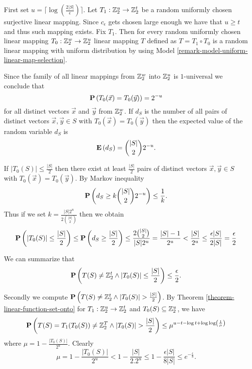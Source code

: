 First set $u = \lceil\log(\frac {2|S|}{\epsilon})\rceil$. Let $T_1: \mathbb{Z}_{2}^{u} \rightarrow \mathbb{Z}_{2}^{t}$ be a random uniformly chosen surjective linear mapping. Since $c_\epsilon$ gets chosen large enough we have that $u \geq t$ and thus such mapping exists.  Fix $T_1$. Then for every random uniformly chosen linear mapping $T_0: \mathbb{Z}_{2}^{w} \rightarrow \mathbb{Z}_{2}^{u}$ linear mapping $T$ defined as $T = T_1 \circ T_0$  is a random linear mapping with uniform distribution by using Model \ref{remark-model-uniform-linear-map-selection}. 

Since the family of all linear mappings from $\mathbb{Z}_{2}^{w}$ into $\mathbb{Z}_{2}^{u}$ is $1$-universal we conclude that \[ \mathbf{P}\left(T_0(\vec{x}) = T_0(\vec{y})\right) = 2 ^ {-u} \] for all distinct vectors $\vec {x}$ and $\vec {y}$ from $\mathbb{Z}_{2}^{w}$. If $d_S$ is the number of  all pairs of distinct vectors $\vec {x},\vec {y}\in S$ with $T_0(\vec {x}) = T_0(\vec {y})$ then the expected value of the random variable $d_S$ is \[ \mathbf{E}\left(d_S\right)= \binom{|S|}{2} 2 ^ {-u} \text{.} \]

If $|T_0(S)| \leq \frac {|S|}{2}$ then there exist at least $\frac {|S|}{2}$ pairs of distinct vectors $\vec {x},\vec {y} \in S$ with $T_0(\vec {x}) = T_0(\vec {y}
)$. By Markov inequality \[ \mathbf{P}\left(d_S \geq k\binom {|S|}{2} 2^{-u}\right) \leq \frac{1}{k} \text{.} \]
Thus if we set $k = \frac {|S|2^u}{2\binom {|S|}{2}}$ then we obtain 
\[ 
	\mathbf{P}\left(|T_0(S)| \leq \frac {|S|}{2}\right) 
		\leq \mathbf{P}\left(d_S \geq \frac {|S|}{2}\right) 
		\leq \frac{2 \binom{|S|}{2}}{|S|2^u} = \frac{|S| - 1}{2^u} < \frac{|S|}{2^u} 
		\leq \frac{\epsilon |S|}{2|S|} = \frac{\epsilon}{2}
\]

We can summarize that
\[ 
\mathbf{P}\left(T(S) \neq \mathbb{Z}_{2}^{t} \wedge |T_0(S)| \leq \frac{|S|}{2}\right) \leq \frac{\epsilon}{2} \text{.}
\]

Secondly we compute $\mathbf{P}\left(T(S) \neq \mathbb{Z}_{2}^{t} \wedge |T_0(S)| > \frac{|S|}{2}\right)$. By Theorem \ref{theorem-linear-function-set-onto} for $T_1: \mathbb{Z}_{2}^{u} \rightarrow \mathbb{Z}_{2}^{t}$ and $T_0(S) \subseteq \mathbb{Z}_{2}^{u}$, we have
\[
	\mathbf{P}\left(T(S) = T_1(T_0(S)) \neq \mathbb{Z}_{2}^{T} \wedge |T_0(S)| > \frac{|S|}{2}\right) \leq \mu ^ {u - t - \log t  +\log\log \left(\frac{1}{\mu}\right) } 
\]
where $\mu = 1- \frac{|T_0(S)|}{2^u}$. Clearly
\[
\mu = 1 - \frac{|T_0(S)|}{2 ^ u} < 1 - \frac{|S|}{2 . 2 ^ u} \leq 1 - \frac{\epsilon |S|}{8|S|} \leq e^{-\frac{\epsilon}{8}}
\text{.}
\]

